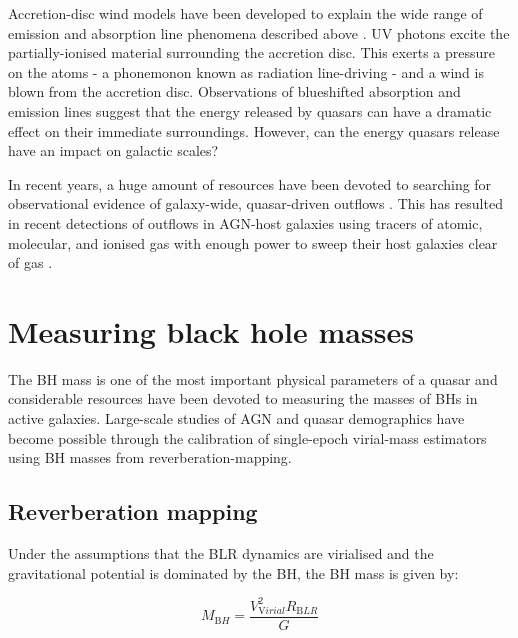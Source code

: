 Accretion-disc wind models have been developed to explain the wide range of emission and absorption line phenomena described above \citep[e.g.][]{murray95,elvis00,proga00,everett05}.
UV photons excite the partially-ionised material surrounding the accretion disc. 
This exerts a pressure on the atoms - a phonemonon known as radiation line-driving - and a wind is blown from the accretion disc. 
Observations of blueshifted absorption and emission lines suggest that the energy released by quasars can have a dramatic effect on their immediate surroundings.  
However, can the energy quasars release have an impact on galactic scales? 

In recent years, a huge amount of resources have been devoted to searching for observational evidence of galaxy-wide, quasar-driven outflows \citep[for recent reviews, see][]{alexander12,fabian12,heckman14}. 
This has resulted in recent detections of outflows in AGN-host galaxies using tracers of atomic, molecular, and ionised gas with enough power to sweep their host galaxies clear of gas \citep[e.g.][]{nesvadba06,arav08,nesvadba08,moe09,dunn10,alexander10,harrison12,harrison14,nesvadba10,rupke13,veilleux13,nardini15,feruglio10,alatalo11,cimatti13,cicone14}.  

\section{Measuring black hole masses}

The BH mass is one of the most important physical parameters of a quasar and considerable resources have been devoted to measuring the masses of BHs in active galaxies. 
Large-scale studies of AGN and quasar demographics have become possible through the calibration of single-epoch virial-mass estimators using BH masses from reverberation-mapping. 

\subsection{Reverberation mapping}

Under the assumptions that the BLR dynamics are virialised  and the gravitational potential is dominated by the BH, the BH mass is given by:

\begin{equation}
M_{\mathrm BH} = \frac{V_{\mathrm Virial}^2R_{\mathrm BLR}}{G} 
\end{equation}

